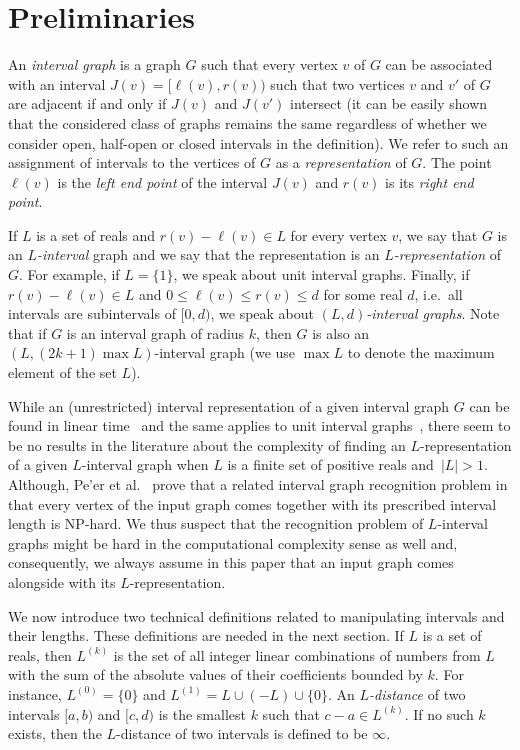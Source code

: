 \documentclass{CSML}
\theoremstyle{plain}\newtheorem{claim}[thm]{Claim}
\begin{document}
\section{Preliminaries}
\label{sec:preliminary}

An {\em interval graph} is a graph $G$ such that
every vertex $v$ of $G$ can be associated with an interval $J(v)=[\ell(v),r(v))$ such that
two vertices $v$ and $v'$ of $G$ are adjacent if and only if $J(v)$ and $J(v')$ intersect
(it can be easily shown that the considered class of graphs remains the same regardless of whether we consider open,
half-open or closed intervals in the definition).
We refer to such an assignment of intervals to the vertices of $G$ as a {\em representation} of $G$.
The point $\ell(v)$ is the {\em left end point} of the interval $J(v)$ and $r(v)$ is its {\em right end point}.

If $L$ is a set of reals and $r(v)-\ell(v)\in L$ for every vertex $v$,
we say that $G$ is an {\em $L$-interval} graph and
we say that the representation is an {\em $L$-representation} of $G$.
For example, if $L=\{1\}$, we speak about unit interval graphs.
Finally, if $r(v)-\ell(v)\in L$ and $0\le\ell(v)\le r(v)\le d$ for some real $d$,
i.e.~all intervals are subintervals of $[0,d)$, we speak about {\em $(L,d)$-interval graphs}.
Note that if $G$ is an interval graph of radius $k$, then $G$ is also an $(L,(2k+1)\max L)$-interval graph (we
use $\max L$ to denote the maximum element of the set $L$).

While an (unrestricted) interval representation of a given interval graph
$G$ can be found in linear time~\cite{bl76} and the
same applies to unit interval graphs~\cite{cknos95},
there seem to be no results in the literature about the complexity of
finding an $L$-representation of a given $L$-interval graph when 
$L$ is a finite set of positive reals and~$|L|>1$.
Although, Pe'er et al.~\cite{ps97} prove that a related
interval graph recognition problem in that every vertex of the input graph 
comes together with its prescribed interval length is NP-hard.
We thus suspect that the recognition problem of $L$-interval graphs might be
hard in the computational complexity sense as well and, consequently, 
we always assume in this paper that an
input graph comes alongside with its $L$-representation.

We now introduce two technical definitions related to manipulating intervals and their lengths.
These definitions are needed in the next section.
If $L$ is a set of reals, then $L^{(k)}$ is the set of all integer linear combinations of numbers from $L$
with the sum of the absolute values of their coefficients bounded by $k$. For instance, $L^{(0)}=\{0\}$ and
$L^{(1)}=L\cup(-L)\cup\{0\}$. An {\em $L$-distance} of two intervals $[a,b)$ and $[c,d)$ is the smallest $k$
such that $c-a\in L^{(k)}$. If no such $k$ exists, then the $L$-distance of two intervals
is defined to be $\infty$.
\end{document}
